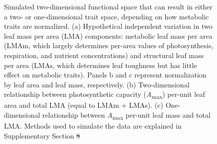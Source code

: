 \documentclass[
  12pt,
  letterpaper,
  DIV=11,
  numbers=noendperiod]{scrartcl}
\providecommand{\DIFadd}[1]{{\protect\color{blue}\uwave{#1}}} %
\providecommand{\DIFdel}[1]{{\protect\color{red}\sout{#1}}}                      %
\providecommand{\DIFaddFL}[1]{\DIFadd{#1}} %
\providecommand{\DIFdelFL}[1]{\DIFdel{#1}} %
\providecommand{\DIFaddbeginFL}{} %
\providecommand{\DIFaddendFL}{} %
\providecommand{\DIFdelbeginFL}{} %
\providecommand{\DIFdelendFL}{} %
\newcommand{\DIFscaledelfig}{0.5}
\newlength{\DIFdelgraphicswidth} %
\newlength{\DIFdelgraphicsheight} %
\newcommand{\DIFaddincludegraphics}[2][]{{\color{blue}\fbox{\DIFOincludegraphics[#1]{#2}}}} %
\newcommand{\DIFdelincludegraphics}[2][]{%
\sbox{\DIFdelgraphicsbox}{\DIFOincludegraphics[#1]{#2}}%
\settoboxwidth{\DIFdelgraphicswidth}{\DIFdelgraphicsbox} %
\settoboxtotalheight{\DIFdelgraphicsheight}{\DIFdelgraphicsbox} %
\scalebox{\DIFscaledelfig}{%
\parbox[b]{\DIFdelgraphicswidth}{\usebox{\DIFdelgraphicsbox}\\[-\baselineskip] \rule{\DIFdelgraphicswidth}{0em}}\llap{\resizebox{\DIFdelgraphicswidth}{\DIFdelgraphicsheight}{%
\setlength{\unitlength}{\DIFdelgraphicswidth}%
\begin{picture}(1,1)%
\thicklines\linethickness{2pt} %
{\color[rgb]{1,0,0}\put(0,0){\framebox(1,1){}}}%
{\color[rgb]{1,0,0}\put(0,0){\line( 1,1){1}}}%
{\color[rgb]{1,0,0}\put(0,1){\line(1,-1){1}}}%
\end{picture}%
}\hspace*{3pt}}} %
} %
\DeclareRobustCommand{\DIFaddbeginFL}{\DIFOaddbeginFL \let\includegraphics\DIFaddincludegraphics} %
\DeclareRobustCommand{\DIFaddendFL}{\DIFOaddendFL \let\includegraphics\DIFOincludegraphics} %
\DeclareRobustCommand{\DIFdelbeginFL}{\DIFOdelbeginFL \let\includegraphics\DIFdelincludegraphics} %
\DeclareRobustCommand{\DIFdelendFL}{\DIFOaddendFL \let\includegraphics\DIFOincludegraphics} %
\begin{document}
\begin{figure}


\caption{\label{fig-hypo}Simulated two-dimensional functional space that
can result in either a two- or one-dimensional trait space, depending on
how metabolic traits are normalized. (a) Hypothetical independent
variation in two leaf mass per area (LMA) components: metabolic leaf
mass per area (LMAm, which largely determines per-area values of
photosynthesis, respiration, and nutrient concentrations) and structural
leaf mass per area (LMAs, which determines leaf toughness but has little
effect on metabolic traits). Panels b and c represent normalization by
leaf area and leaf mass, respectively. (b) Two-dimensional relationship
between photosynthetic capacity (\emph{A}\textsubscript{max}) per-unit
leaf area and total LMA (equal to LMAm + LMAs). (c) One-dimensional
relationship between \emph{A}\textsubscript{max} per-unit leaf mass and
total LMA. Methods used to simulate the data are explained in
Supplementary Section \DIFdelbeginFL \DIFdelFL{8}\DIFdelendFL \DIFaddbeginFL \DIFaddFL{6.}\DIFaddendFL }

\end{figure}%

\newpage
\end{document}
